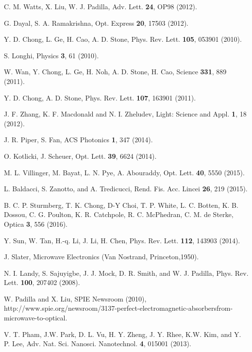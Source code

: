 \documentclass[aps,prl,twocolumn,showpacs,groupedaddress,amsmath,amssymb]{revtex4}
\begin{document}
\begin{thebibliography}{1}

C. M. Watts, X. Liu, W. J. Padilla, Adv. Lett. {\bf 24}, OP98 (2012).

G. Dayal, S. A. Ramakrishna, Opt. Express {\bf 20}, 17503 (2012).

Y. D. Chong, L. Ge, H. Cao, A. D. Stone, Phys. Rev. Lett. {\bf 105}, 053901 (2010).

S. Longhi, Physics {\bf 3}, 61 (2010).

 W. Wan, Y. Chong, L. Ge, H. Noh, A. D. Stone, H. Cao, Science {\bf 331}, 889 (2011).

Y. D. Chong, A. D. Stone, Phys. Rev. Lett. {\bf 107}, 163901 (2011).

J. F. Zhang, K. F. Macdonald and N. I. Zheludev, Light: Science and Appl.  {\bf 1}, 18 (2012).

 J. R. Piper, S. Fan, ACS Photonics {\bf 1}, 347 (2014).

 O. Kotlicki, J. Scheuer, Opt. Lett. {\bf 39}, 6624 (2014). 

 M. L. Villinger, M. Bayat, L. N. Pye, A. Abouraddy, Opt. Lett. {\bf 40}, 5550 (2015).

L. Baldacci, S. Zanotto, and A. Tredicucci, Rend. Fis. Acc. Lincei {\bf 26}, 219 (2015). 

B. C. P. Sturmberg, T. K. Chong, D-Y Choi, T. P. White, L. C. Botten, K. B. Dossou, 
C. G. Poulton, K. R. Catchpole, R. C. McPhedran, C. M. de Sterke, Optica {\bf 3}, 556 (2016).

Y. Sun, W. Tan, H.-q. Li, J. Li, H. Chen, Phys. Rev. Lett. {\bf 112}, 143903 (2014).

J. Slater, Microwave Electronics (Van Nostrand, Princeton,1950).

 N. I. Landy, S. Sajuyigbe, J. J. Mock, D. R. Smith, and W. J. Padilla, Phys. Rev. Lett. {\bf 100}, 207402 (2008).

 W. Padilla and X. Liu, SPIE Newsroom (2010), http://www.spie.org/newsroom/3137-perfect-electromagnetic-absorbersfrom-microwave-to-optical.

 V. T. Pham, J.W. Park, D. L. Vu, H. Y. Zheng, J. Y. Rhee, K.W. Kim, and Y. P. Lee, Adv. Nat. Sci. Nanosci. 
Nanotechnol. {\bf 4}, 015001 (2013).


\end{thebibliography}
\end{document}
